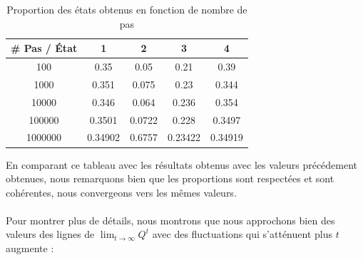 \begin{table}[h!]
  \begin{tabular}{|c|c|c|c|c|}
  \hline
  \# Pas / État & \multicolumn{1}{c|}{1} & \multicolumn{1}{c|}{2} & \multicolumn{1}{c|}{3} & 4 \\ \hline
  100     & 0.35    & 0.05   & 0.21    & 0.39    \\ \hline
  1000    & 0.351   & 0.075  & 0.23    & 0.344   \\ \hline
  10000   & 0.346   & 0.064  & 0.236   & 0.354   \\ \hline
  100000  & 0.3501  & 0.0722 & 0.228   & 0.3497  \\ \hline
  1000000 & 0.34902 & 0.6757 & 0.23422 & 0.34919 \\ \hline
  \end{tabular}
  \centering
  \caption{Proportion des états obtenus en fonction de nombre de pas}
  \label{tab:table-prop}
\end{table}
En comparant ce tableau avec les résultats obtenus avec les valeurs précédement obtenues, nous remarquons bien que les proportions sont respectées et sont cohérentes, nous convergeons 
vers les mêmes valeurs.
\\\\
Pour montrer plus de détails, nous montrons que nous approchons bien des valeurs des lignes de $\lim_{t \rightarrow \infty} Q^t$ avec des fluctuations qui s'atténuent plus $t$ augmente :

